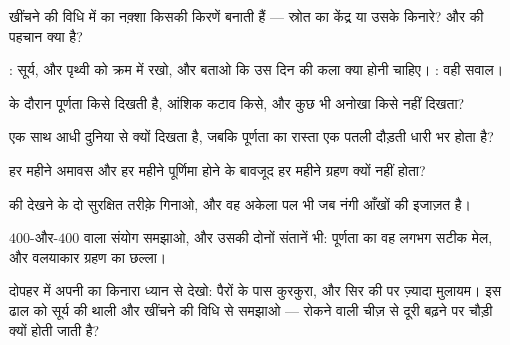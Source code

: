 \begin{exercise}[$\star$]\label{exo:g7:shadows-eclipses:3}
खींचने की विधि में  का नक़्शा किसकी किरणें बनाती हैं --- स्रोत का
केंद्र या उसके किनारे? और  की पहचान क्या है?
\end{exercise}

\begin{exercise}[$\star$]\label{exo:g7:shadows-eclipses:4}
: सूर्य,  और पृथ्वी को क्रम में रखो, और बताओ कि उस
दिन  की कला क्या होनी चाहिए। : वही सवाल।
\end{exercise}

\begin{exercise}[$\star$]\label{exo:g7:shadows-eclipses:5}
 के दौरान पूर्णता किसे दिखती है, आंशिक कटाव किसे, और कुछ भी
अनोखा किसे नहीं दिखता?
\end{exercise}

\begin{exercise}[$\star$]\label{exo:g7:shadows-eclipses:6}
 एक साथ आधी दुनिया से क्यों दिखता है, जबकि पूर्णता का रास्ता
एक पतली दौड़ती धारी भर होता है?
\end{exercise}

\begin{exercise}[$\star$]\label{exo:g7:shadows-eclipses:7}
हर महीने अमावस और हर महीने पूर्णिमा होने के बावजूद हर महीने ग्रहण
क्यों नहीं होता?
\end{exercise}

\begin{exercise}[$\star$]\label{exo:g7:shadows-eclipses:8}
 की  देखने के दो सुरक्षित तरीक़े गिनाओ, और वह अकेला पल भी
जब नंगी आँखों की इजाज़त है।
\end{exercise}

\begin{exercise}[$\star\star$]\label{exo:g7:shadows-eclipses:9}
$400$-और-$400$ वाला संयोग समझाओ, और उसकी दोनों संतानें भी: पूर्णता का
वह लगभग सटीक मेल, और वलयाकार ग्रहण का छल्ला।
\end{exercise}

\begin{exercise}[$\star\star$]\label{exo:g7:shadows-eclipses:10}
दोपहर में अपनी  का किनारा ध्यान से देखो: पैरों के पास कुरकुरा, और
सिर की  पर ज़्यादा मुलायम। इस ढाल को सूर्य की थाली और खींचने की
विधि से समझाओ --- रोकने वाली चीज़ से दूरी बढ़ने पर  चौड़ी
क्यों होती जाती है?
\end{exercise}

